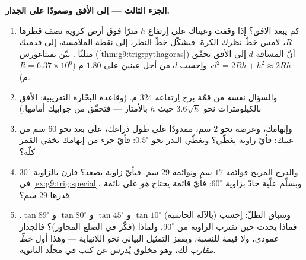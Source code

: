 \begin{problem}
\medskip
\noindent\textbf{الجزء الثالث --- إلى الأفق وصعودًا على الجدار.}
\begin{enumerate}[resume]
  \item كم يبعد الأفق؟ إذا وقفت وعيناك على اِرتفاع $h$ مترًا
        فوق أرض كروية نصف قطرها $R$، لامس خطّ نظرك الكرة:
        فيشكّل خطّ النظر،  إلى نقطة الملامسة،
         إلى قدميك مثلثًا . بيّن
        بفيثاغورس (\cref{thm:g9:trig:pythagoras}) أنّ المسافة
        $d$ إلى الأفق تحقّق $d^2 = 2Rh + h^2 \approx 2Rh$،
        واِحسب $d$ من أجل عينين على $1.80$ م
        ($R = 6.37 \times 10^6$ م).
  \item والسؤال نفسه من قمّة برج اِرتفاعه $324$ م. (وقاعدة
        البحّارة التقريبية: الأفق بالكيلومترات نحو
        $3.6\sqrt{h}$ حيث $h$ بالأمتار --- فتحقّق من جوابيك
        أمامها.)
  \item وإبهامك، وعرضه نحو $2$ سم، ممدودًا على طول ذراعك، على
        بعد نحو $60$ سم من عينك: فأيّ زاوية يغطّي؟ ويغطّي البدر
        نحو $0.5^\circ$: فأيّ جزء من إبهامك يخفي القمر كلّه؟
  \item والدرج المريح قوائمه $17$ سم ونوائمه $29$ سم. فبأيّ
        زاوية يصعد؟ قارن بالزاوية $30^\circ$ في
        \cref{ex:g9:trig:special}، وبسلّم علّية حادّ بزاوية
        $60^\circ$: فأيّ قائمة يحتاج \emph{هو} على نائمة قدرها
        $29$ سم؟
  \item وسباق الظلّ: اِحسب (بالآلة الحاسبة)
        $\tan 10^\circ$ و $\tan 45^\circ$ و $\tan 80^\circ$
        و $\tan 89^\circ$. فماذا يحدث حين تقترب الزاوية من
        $90^\circ$، ولماذا (فكّر في الضلع المجاور)؟ فالجدار
        عمودي، ولا قيمة للنسبة، ويقفز التمثيل البياني نحو
        اللانهاية --- وهذا أول \emph{خطّ مقارب} لك، وهو مخلوق
        يُدرس عن كثب في مجلّد الثانوية.
\end{enumerate}
\end{problem}
